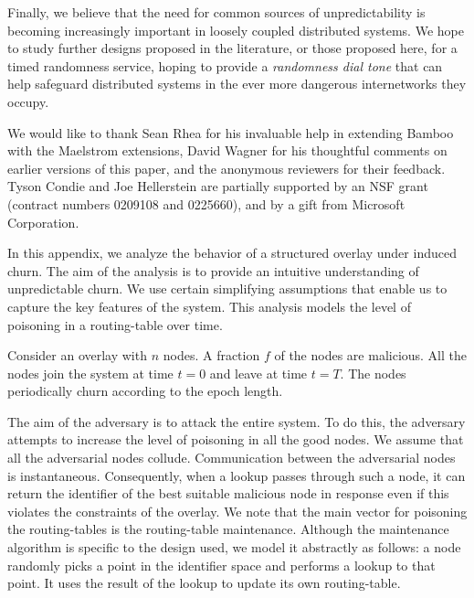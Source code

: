 \documentclass[10pt,twocolumn]{article}
\newcommand{\PRT}{OptRT\xspace}
\begin{document}
Finally, we believe that the need for common sources of unpredictability
is becoming increasingly important in loosely coupled distributed
systems.  We hope to study further designs proposed in the
literature, or those proposed here, for a timed randomness
service, hoping to provide a \emph{randomness dial tone} that can help
safeguard distributed systems in the ever more
dangerous internetworks they occupy.

%

We would like to thank Sean Rhea for his invaluable help in extending
Bamboo with the Maelstrom extensions, David Wagner for his
thoughtful comments on earlier versions of this paper, and the anonymous
reviewers for their feedback.  Tyson Condie and Joe Hellerstein are
partially supported by an NSF grant (contract numbers 0209108 and
0225660), and by a gift from Microsoft Corporation.





%


\appendix

\label{sec:evaluation:analysis}

In this appendix, we analyze the behavior of a structured overlay under induced churn. The aim of the analysis is to provide an intuitive understanding of unpredictable churn. We use certain simplifying assumptions that enable us to capture the key features of the system. This analysis models the level of poisoning in a routing-table over time.

Consider an overlay with $n$ nodes. A fraction $f$ of the nodes are malicious.
All the nodes join the system at time $t=0$ and
leave at time $t=T$. The nodes periodically churn according to the epoch
length. 

The aim of the adversary is to attack the entire system. To do this, the adversary
attempts to increase the level of poisoning in all the good nodes. We assume
that all the adversarial nodes collude. Communication between the adversarial nodes
is instantaneous. Consequently, when a lookup passes through such a node,
it can return the identifier of the best suitable malicious node in response even if this violates the constraints of the overlay. We note that the main
vector for poisoning the routing-tables is the routing-table maintenance.
Although the maintenance algorithm is specific to the design used, we model it
abstractly as follows: a node randomly picks a point in the identifier
space and performs a lookup to that point. It uses the
result of the lookup to update its own routing-table. 
\end{document}
